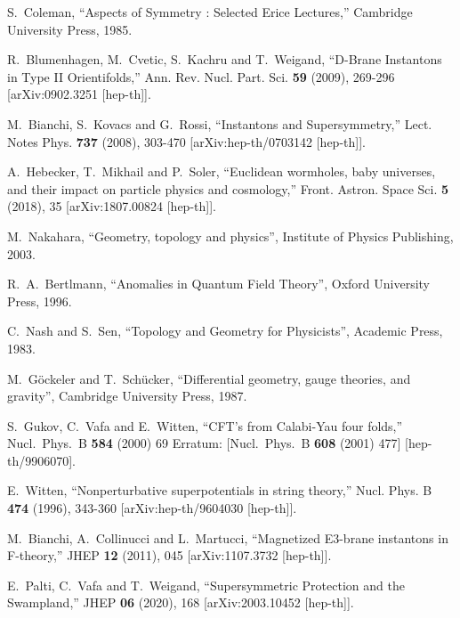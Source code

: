 \documentclass[12pt]{article}
\numberwithin{equation}{section}
\begin{document}
\begin{thebibliography}{999}
  S.~Coleman,
  ``Aspects of Symmetry : Selected Erice Lectures,'' Cambridge University Press, 1985.

R.~Blumenhagen, M.~Cvetic, S.~Kachru and T.~Weigand,
``D-Brane Instantons in Type II Orientifolds,''
Ann. Rev. Nucl. Part. Sci. \textbf{59} (2009), 269-296
[arXiv:0902.3251 [hep-th]].

M.~Bianchi, S.~Kovacs and G.~Rossi,
``Instantons and Supersymmetry,''
Lect. Notes Phys. \textbf{737} (2008), 303-470
[arXiv:hep-th/0703142 [hep-th]].

A.~Hebecker, T.~Mikhail and P.~Soler,
``Euclidean wormholes, baby universes, and their impact on particle physics and cosmology,''
Front. Astron. Space Sci. \textbf{5} (2018), 35
[arXiv:1807.00824 [hep-th]].

 M.~Nakahara, ``Geometry, topology and physics'', Institute of Physics Publishing, 2003.

 R.~A.~Bertlmann, ``Anomalies in Quantum Field Theory'', Oxford University Press, 1996.

 C.~Nash and S.~Sen, ``Topology and Geometry for Physicists'', Academic Press, 1983.

 M.~G\"ockeler and T.~Sch\"ucker, ``Differential geometry, gauge theories, and gravity'', Cambridge University Press, 1987.

  S.~Gukov, C.~Vafa and E.~Witten, ``CFT's from Calabi-Yau four folds,''
  Nucl.\ Phys.\ B {\bf 584} (2000) 69
  Erratum: [Nucl.\ Phys.\ B {\bf 608} (2001) 477] [hep-th/9906070].

E.~Witten,
``Nonperturbative superpotentials in string theory,''
Nucl. Phys. B \textbf{474} (1996), 343-360
[arXiv:hep-th/9604030 [hep-th]].

M.~Bianchi, A.~Collinucci and L.~Martucci,
``Magnetized E3-brane instantons in F-theory,''
JHEP \textbf{12} (2011), 045
[arXiv:1107.3732 [hep-th]].

E.~Palti, C.~Vafa and T.~Weigand,
``Supersymmetric Protection and the Swampland,''
JHEP \textbf{06} (2020), 168
[arXiv:2003.10452 [hep-th]].


\end{thebibliography}
\end{document}

